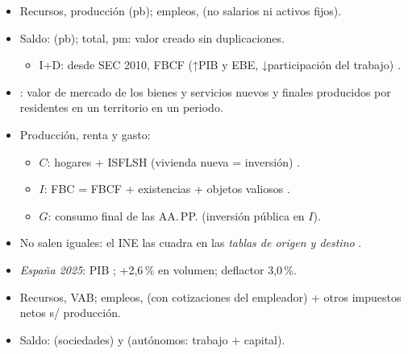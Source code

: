 \documentclass{article}
\begin{document}
\begin{columnas}
\begin{itemize}
\item Recursos, producción (pb); empleos,  (no salarios ni activos fijos).
\item Saldo:  (pb); total,  pm: valor creado sin duplicaciones.
  \begin{itemize}
  \item I+D: desde SEC 2010, FBCF (↑PIB y EBE, ↓participación del trabajo) .
  \end{itemize}
\item {}: valor de mercado de los bienes y servicios nuevos y finales producidos por residentes en un territorio en un periodo.
\end{itemize}
\begin{itemize}
\item Producción, renta y gasto:
  \begin{itemize}
  \item $C$: hogares + ISFLSH (vivienda nueva = inversión) .
  \item $I$: FBC = FBCF + existencias + objetos valiosos .
  \item $G$: consumo final de las AA.\,PP. (inversión pública en $I$).
  \end{itemize}
\item No salen iguales: el INE las cuadra en las \emph{tablas de origen y destino} .
\item \emph{España 2025}: PIB ; +2,6\,\% en volumen; deflactor 3,0\,\%.
\end{itemize}
\begin{itemize}
\item Recursos, VAB; empleos,  (con cotizaciones del empleador) + otros impuestos netos s/ producción.
\item Saldo:  (sociedades) y  (autónomos: trabajo + capital).

\end{itemize}
\end{columnas}
\end{document}
